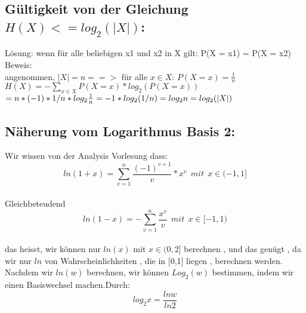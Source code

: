 \documentclass[11pt]{article}
\begin{document}
\subsection{G\"ultigkeit von der Gleichung $H(X) <= log_2(|X|)$:}
  L\"osung: wenn f\"ur alle beliebigen x1 und x2 in X gilt: P(X = x1) = P(X = x2)\\
 Beweis: \\
 angenommen, $|X| = n ==>$ f\"ur alle $x \in X$: $P(X = x) = \frac{1}{n} $\\
 $ H(X) = - \sum\limits_{x \in X}P(X = x) * log_2{(P(X = x))}$     \\    
  $= n * (-1) * 1/n * log_2{\frac{1}{n}} \\        
   = -1 * log_2{(1/n)}\\
  = log_2{n} \\
   = log_2{(|X|)} \\
$
\begin{large}
\subsection{N\"aherung vom Logarithmus Basis 2:}

Wir wissen von der Analysis Vorlesung dass:
 $$ ln{(1+x)}=\sum\limits_{v=1}^n\frac{(-1)^{v+1}}{v}*x^v  \ \ mit \ \ x \in (-1,1] $$   \\ Gleichbeteudend\\
 $$ ln{(1-x)}= -\sum\limits_{v=1}^n\frac{x^v}{v}  \ \ mit \ \ x \in [-1,1) $$ \\
 das heisst, wir k\"onnen nur $ln{(x)}$ mit $x \in (0,2]$ berechnen , und das gen\"ugt , da wir nur $ln{}$ von Wahrscheinlichkeiten , die in [0,1] liegen , berechnen werden. Nachdem wir $ln{(w)}$ berechnen, wir k\"onnen $Log_2(w)$ bestimmen, indem wir einen Basiswechsel machen.Durch: $$\displaystyle{log_2{x}=\frac{ln{w}}{ln{2}}}$$\\
\end{large} 
\end{document}
